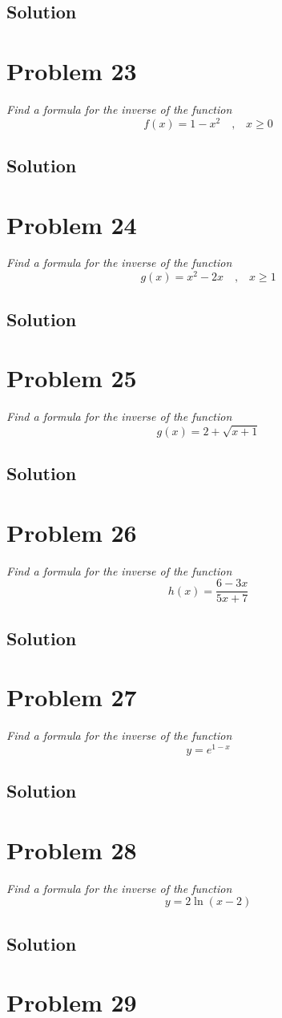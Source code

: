 \documentclass[11pt]{article}
\newcommand{\soln}{\subsection*}
\newcommand{\qn}{\textit}
\newcommand{\eqtext}[1]{\quad\text{#1}\quad}
\begin{document}
\soln{Solution}

\section*{Problem 23}

\qn{Find a formula for the inverse of the function $$f(x)=1-x^2 \eqtext{,} x \ge 0$$}

\soln{Solution}

\section*{Problem 24}

\qn{Find a formula for the inverse of the function $$g(x)=x^2-2x \eqtext{,} x \ge 1$$}

\soln{Solution}

\section*{Problem 25}

\qn{Find a formula for the inverse of the function $$g(x)=2+\sqrt{x+1}$$}

\soln{Solution}

\section*{Problem 26}

\qn{Find a formula for the inverse of the function $$h(x)=\frac{6-3x}{5x+7}$$}

\soln{Solution}

\section*{Problem 27}

\qn{Find a formula for the inverse of the function $$y=e^{1-x}$$}

\soln{Solution}

\section*{Problem 28}

\qn{Find a formula for the inverse of the function $$y=2\ln(x-2)$$}

\soln{Solution}

\section*{Problem 29}
\end{document}
